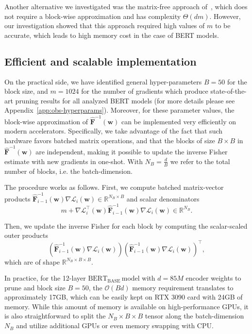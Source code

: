 \documentclass[11pt]{article}
\newcommand{\vect}[1]{\mathbf{#1}}
\newcommand{\w}{\mathbf{w}}
\newcommand{\pr}[1]{\left(#1\right)}
\newcommand{\eF}{\widehat{\vect{F}}}
\newcommand{\bert}{$\textrm{BERT}_{\textrm{BASE}}\,$}
\begin{document}
{Another alternative we investigated was the matrix-free approach of~\citet{Frantar2021EfficientMA}, which does not require a block-wise approximation and has complexity $\Theta(dm)$. However, our investigation showed that this approach required high values of $m$ to be accurate, which leads to high memory cost in the case of BERT models.} 

\subsection{Efficient and scalable implementation}

On the practical side, we have identified general hyper-parameters $B = 50$ for the block size, and $m = 1024$ for the number of gradients which produce state-of-the-art pruning results for all analyzed BERT models (for more details please see Appendix~\ref{app:obs-hyperparams}). 
Moreover, for these parameter values, the block-wise approximation of $\eF^{-1}(\w)$ can be implemented very efficiently on modern accelerators. Specifically, we take advantage of the fact that such hardware favors batched matrix operations, and that the blocks of size $B \times B$ in $\eF^{-1}(\w)$ are independent, making it possible to update the inverse Fisher estimate with new gradients in one-shot. With $N_B = \frac{d}{B}$ we refer to the total number of blocks, {i.e.} the batch-dimension. 

The procedure works as follows. First, we compute batched matrix-vector products $\eF^{-1}_{i-1}(\w) \nabla \mathcal{L}_i(\w) \in \mathbb{R}^{N_B \times B}$ and scalar denominators \[m + \nabla \mathcal{L}^\top_i(\w) \eF^{-1}_{i-1}(\w) \nabla \mathcal{L}_i(\w) \in \mathbb{R}^{N_B}.\] 

Then, we update the inverse Fisher for each block by computing the scalar-scaled outer products 
\[\pr{\eF^{-1}_{i-1}(\w) \nabla \mathcal{L}_i(\w)} \pr{\eF^{-1}_{i-1}(\w) \nabla \mathcal{L}_i(\w)}^\top,\]
\noindent which are of shape  $\mathbb{R}^{N_B \times B \times B}.$

In practice, for the 12-layer \bert model with $d=85M$ encoder weights to prune and block size $B=50$, the $\mathcal{O}(Bd)$ memory requirement translates to approximately 17GB, which can be easily kept on RTX 3090 card with 24GB of memory. While this amount of memory is available on high-performance GPUs, it is also straightforward to split the $N_B \times B \times B$ tensor along the batch-dimension $N_B$ and utilize additional GPUs or even memory swapping with CPU.
\end{document}
